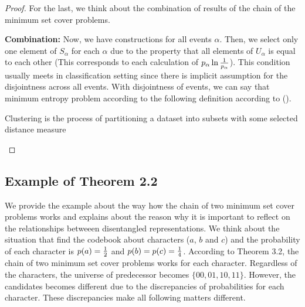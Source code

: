 \begin{proof}
For the last, we think about the combination of results of the chain of the minimum set cover problems. 

\textbf{Combination: }
Now, we have constructions for all events $\alpha$.
Then, we select only one element of $S_{\alpha}$ for each $\alpha$ due to the property 
that all elements of $U_{\alpha}$ is equal to each other (This corresponds to each calculation of $p_{\alpha}\ln{1 \over p_\alpha}$). 
This condition usually meets in classification setting since there is implicit assumption for the disjointness across all events.
With disjointness of events,  we can say that minimum entropy problem according to the following definition according to (\cite{Soni12}).

\begin{definition}
\label{def:clustering}
Clustering  is the process of partitioning a dataset into subsets with some selected distance measure
\end{definition}
\end{proof}


\subsection{Example of Theorem 2.2}
We provide the example about the way how the chain of two minimum set cover problems works
and explains about the reason why it is important to reflect on the relationships betweeen disentangled representations.
We think about the situation that find the codebook about characters ($a$, $b$ and $c$)
and the probability of each character is $p(a)={1 \over 2}$ and $p(b)=p(c)={1 \over 4}$.
According to Theorem 3.2, the chain of two minimum set cover problems works for each character.  
Regardless of the characters, the universe of predecessor becomes $\{00, 01, 10, 11\}$.
However, the candidates becomes different due to the discrepancies of probabilities for each character.
These discrepancies make all following matters different. 

